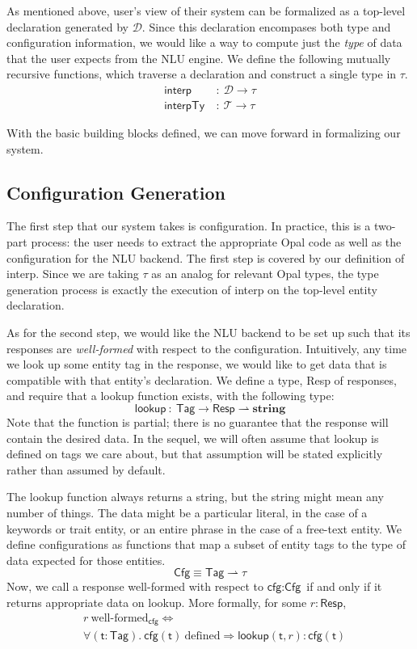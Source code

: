 \documentclass[twocolumn]{article}
\newcommand{\fcy}[1]{\mathcal{#1}}
\newcommand{\etag}[1]{\textsf{#1}}
\newcommand{\ff}[1]{\textsf{#1}}
\begin{document}
As mentioned above, user's view of their system can be formalized as a top-level
declaration generated by $\fcy{D}$. Since this declaration encompases both type
and configuration information, we would like a way to compute just the
\emph{type} of data that the user expects from the NLU engine. We define the
following mutually recursive functions, which traverse a declaration and
construct a single type in $\tau$.
\begin{align*}
  \ff{interp}\ &:\ \fcy{D} \to \tau \\
  \ff{interpTy}\ &:\ \fcy{T} \to \tau
\end{align*}

With the basic building blocks defined, we can move forward in formalizing our
system. 

\subsection{Configuration Generation}
The first step that our system takes is configuration. In practice, this is a
two-part process: the user needs to extract the appropriate Opal code as well as
the configuration for the NLU backend. The first step is covered by our
definition of \ff{interp}. Since we are taking $\tau$ as an analog for relevant
Opal types, the type generation process is exactly the execution of \ff{interp}
on the top-level entity declaration.

As for the second step, we would like the NLU backend to be set up such that its
responses are \emph{well-formed} with respect to the configuration. Intuitively,
any time we look up some entity tag in the response, we would like to get data
that is compatible with that entity's declaration. We define a type,
\textsf{Resp} of responses, and require that a \ff{lookup} function exists, with
the following type:
$$ \ff{lookup}\ :\ \ff{Tag} \to \ff{Resp} \rightharpoonup \textbf{string} $$
Note that the function is partial; there is no guarantee that the response will
contain the desired data. In the sequel, we will often assume that \ff{lookup}
is defined on tags we care about, but that assumption will be stated explicitly
rather than assumed by default.

The \ff{lookup} function always returns a string, but the string might mean any
number of things. The data might be a particular literal, in the case of a
keywords or trait entity, or an entire phrase in the case of a free-text entity.
We define configurations as functions that map a subset of entity tags to the
type of data expected for those entities.
$$ \ff{Cfg} \equiv \ff{Tag} \rightharpoonup \tau $$
Now, we call a response well-formed with respect to $\ff{cfg} : \ff{Cfg}$ if and
only if it returns appropriate data on \ff{lookup}. More formally, for some $r :
\ff{Resp}$,
\begin{align*}
  &r\ \text{well-formed}_{\ff{cfg}} \iff \\
  &\forall (\etag{t} : \textsf{Tag}).\ \ff{cfg}(\etag{t})\ \text{defined} \Rightarrow \ff{lookup}(\etag{t}, r) : \ff{cfg}(\etag{t})
\end{align*}
\end{document}
